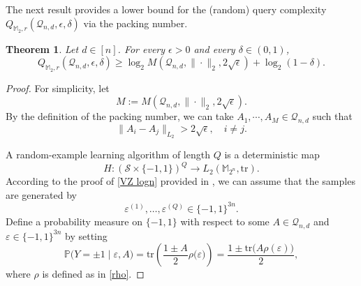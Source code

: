 \documentclass{amsbook}
\newtheorem{theorem}{Theorem}[chapter]
\theoremstyle{definition}
\theoremstyle{remark}
\numberwithin{section}{chapter}
\numberwithin{equation}{chapter}
\newcommand{\M}{\mathbb{M}}
\newcommand{\1}{\mathbf{1}}
\begin{document}
The next result provides a lower bound for the (random) query complexity  	$Q_{\M_2,r}(\mathcal Q_{n,d},\epsilon,\delta)$ via the packing number. 
\begin{theorem}\label{boolean-Proposition-8-packing}
Let $d\in [n]$.	For every $\epsilon>0$ and every $\delta\in(0,1)$,
	\begin{equation}\label{Qbr-20}
		Q_{\M_2,r}(\mathcal Q_{n,d},\epsilon,\delta)
		\geq \log_2 M(\mathcal Q_{n,d},\|\cdot\|_2,2\sqrt{\epsilon})+\log_2(1-\delta).
	\end{equation}
\end{theorem}

\begin{proof}
 For simplicity,  let
	\[
M:=M(\mathcal Q_{n,d},\|\cdot\|_2,2\sqrt{\epsilon}).
	\]
By the definition of the packing number, we can take \(A_1,\cdots,A_M\in \mathcal Q_{n,d}\) such that 
\begin{equation}\label{geq epsilon}
\|A_i-A_j\|_{L_2}>2\sqrt{\epsilon},\quad i\neq j. 
\end{equation} 


A random-example learning algorithm of length $Q$ is a deterministic map
\[H:(\mathcal S\times\{-1,1\})^Q\to L_2(\mathbb M_{2^n},\mathrm{tr}).\]
According to the proof of \eqref{VZ logn} provided in \cite{VZ2024}, we can assume that the samples are generated by
\[\varepsilon^{(1)},\dots,\varepsilon^{(Q)}\in \{-1,1\}^{3n}.\]
Define a probability  measure on \(\{-1,1\}\) with respect to some $A\in \mathcal{Q}_{n,d}$ and $\varepsilon\in \{-1,1\}^{3n}$ by setting
		\begin{equation}\label{P-YA}
			\mathbb{P}\bigl(Y=\pm1\mid \varepsilon,A\bigr)
			=\mathrm{tr} \left(\frac{1\pm A}{2}\rho\bigl(\varepsilon\bigr)\right)
			=\frac{1\pm \mathrm{tr}\bigl(A\rho(\varepsilon)\bigr)}{2},
		\end{equation}
		where $\rho$ is defined as in \eqref{rho}. 
		

\end{proof}
\end{document}
